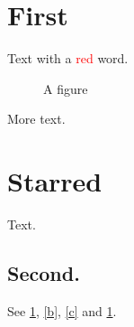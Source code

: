 \documentclass[12pt]{article}
\begin{document}
\section{First}\label{a}
Text with a \textcolor{red}{red} word.

\begin{figure}[h]\centering\caption{A figure}\label{fig}\end{figure}

More text.\label{b}
\section*{Starred}
Text.\label{c}
\subsection{Second.}\label{e}
See \ref{a}, \ref{b}, \ref{c} and \ref{fig}.\label{d}
\end{document}
